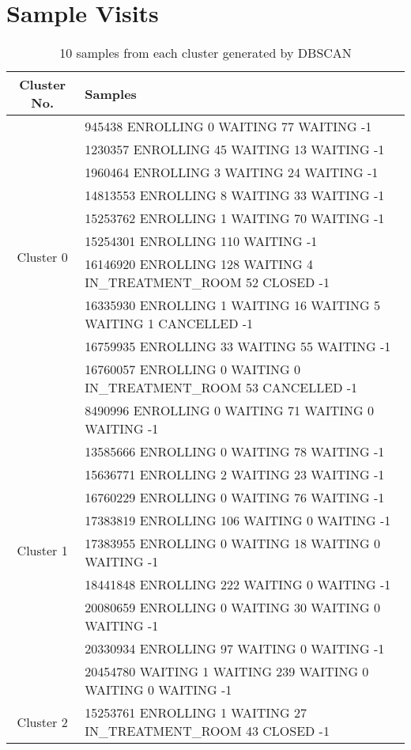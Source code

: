 \chapter{Sample Visits}
\label{chapter:Visit Samples}

{\scriptsize
\begin{longtable}{|c|p{}|}
\caption{10 samples from each cluster generated by DBSCAN}
\label{tab:samplesFromCluster}\\
		\hline
		Cluster No. & Samples \\
		\hline
		\multirow{10}{*}{Cluster 0}
		& 945438 ENROLLING 0 WAITING 77 WAITING -1 \\
		& 1230357 ENROLLING 45 WAITING 13 WAITING -1 \\
		& 1960464 ENROLLING 3 WAITING 24 WAITING -1 \\
		& 14813553 ENROLLING 8 WAITING 33 WAITING -1 \\
		& 15253762 ENROLLING 1 WAITING 70 WAITING -1 \\
		& 15254301 ENROLLING 110 WAITING -1 \\
		& 16146920 ENROLLING 128 WAITING 4 IN\_TREATMENT\_ROOM 52 CLOSED -1 \\
		& 16335930 ENROLLING 1 WAITING 16 WAITING 5 WAITING 1 CANCELLED -1 \\
		& 16759935 ENROLLING 33 WAITING 55 WAITING -1 \\
		& 16760057 ENROLLING 0 WAITING 0 IN\_TREATMENT\_ROOM 53 CANCELLED -1 \\
		\hline
		\multirow{10}{*}{Cluster 1}
		& 8490996 ENROLLING 0 WAITING 71 WAITING 0 WAITING -1 \\
		& 13585666 ENROLLING 0 WAITING 78 WAITING -1 \\
		& 15636771 ENROLLING 2 WAITING 23 WAITING -1 \\
		& 16760229 ENROLLING 0 WAITING 76 WAITING -1 \\
		& 17383819 ENROLLING 106 WAITING 0 WAITING -1 \\
		& 17383955 ENROLLING 0 WAITING 18 WAITING 0 WAITING -1 \\
		& 18441848 ENROLLING 222 WAITING 0 WAITING -1 \\
		& 20080659 ENROLLING 0 WAITING 30 WAITING 0 WAITING -1 \\
		& 20330934 ENROLLING 97 WAITING 0 WAITING -1 \\
		& 20454780 WAITING 1 WAITING 239 WAITING 0 WAITING 0 WAITING -1 \\
		\hline
		\multirow{10}{*}{Cluster 2}
		& 15253761 ENROLLING 1 WAITING 27 IN\_TREATMENT\_ROOM 43 CLOSED -1 \\

\end{longtable}}
